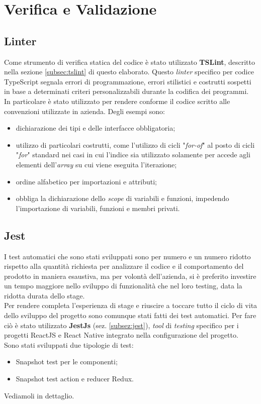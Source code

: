 
\chapter{Verifica e Validazione}\label{chap:tests}
\section{Linter}
Come strumento di verifica statica del codice è stato utilizzato \textbf{TSLint}, descritto nella sezione \ref{subsec:tslint} di questo elaborato. Questo \emph{linter} specifico per codice TypeScript segnala errori di programmazione, errori stilistici e costrutti sospetti in base a determinati criteri personalizzabili durante la codifica dei programmi.\\
In particolare è stato utilizzato per rendere conforme il codice scritto alle convenzioni utilizzate in azienda. Degli esempi sono:
\begin{itemize}
	\item dichiarazione dei tipi e delle interfacce obbligatoria;
	\item utilizzo di particolari costrutti, come l'utilizzo di cicli "\emph{for-of}" al posto di cicli "\emph{for}" standard nei casi in cui l'indice sia utilizzato solamente per accede agli elementi dell'\emph{array} su cui viene eseguita l'iterazione;
	\item ordine alfabetico per importazioni e attributi; 
	\item obbliga la dichiarazione dello \emph{scope} di variabili e funzioni, impedendo l'importazione di variabili, funzioni e membri privati.
\end{itemize}
\section{Jest}
I test automatici che sono stati sviluppati sono per numero e un numero ridotto rispetto alla quantità richiesta per analizzare il codice e il comportamento del prodotto in maniera esaustiva, ma per volontà dell'azienda, si è preferito investire un tempo maggiore nello sviluppo di funzionalità che nel loro testing, data la ridotta durata dello stage. \\
Per rendere completa l'esperienza di stage e riuscire a toccare tutto il ciclo di vita dello sviluppo del progetto sono comunque stati fatti dei test automatici. Per fare ciò è stato utilizzato \textbf{JestJs} (sez. \ref{subsez:jest}), \emph{tool} di \emph{testing} specifico per i progetti ReactJS e React Native integrato nella configurazione del progetto. \\
Sono stati sviluppati due tipologie di test:
\begin{itemize}
	\item Snapshot test per le componenti;
	\item Snapshot test action e reducer Redux.
\end{itemize}
Vediamoli in dettaglio.

